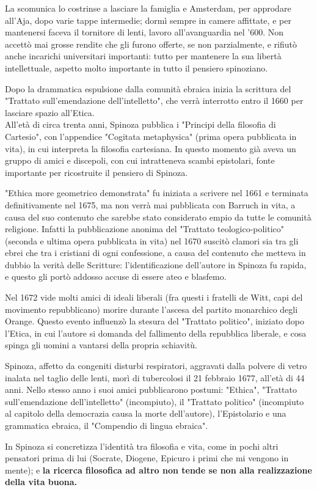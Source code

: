 La scomunica lo costrinse a lasciare la famiglia e Amsterdam, per approdare all'Aja, dopo varie tappe intermedie; dormì sempre in camere affittate, e per mantenersi faceva il tornitore di lenti, lavoro all'avanguardia nel '600. Non accettò mai grosse rendite che gli furono offerte, se non parzialmente, e rifiutò anche incarichi universitari importanti: tutto per mantenere la sua libertà intellettuale, aspetto molto importante in tutto il pensiero spinoziano.

Dopo la drammatica espulsione dalla comunità ebraica inizia la scrittura del "Trattato sull'emendazione dell'intelletto", che verrà interrotto entro il 1660 per lasciare spazio all'Etica.\\ All'età di circa trenta anni, Spinoza pubblica i "Principi della filosofia di Cartesio", con l'appendice "Cogitata metaphysica" (prima opera pubblicata in vita), in cui interpreta la filosofia cartesiana. In questo momento già aveva un gruppo di amici e discepoli, con cui intratteneva scambi epistolari, fonte importante per ricostruite il pensiero di Spinoza.

"Ethica more geometrico demonstrata" fu iniziata a scrivere nel 1661 e terminata definitivamente nel 1675, ma non verrà mai pubblicata con Barruch in vita, a causa del suo contenuto che sarebbe stato considerato empio da tutte le comunità religione. Infatti la pubblicazione anonima del "Trattato teologico-politico" (seconda e ultima opera pubblicata in vita) nel 1670 suscitò clamori sia tra gli ebrei che tra i cristiani di ogni confessione, a causa del contenuto che metteva in dubbio la verità delle Scritture: l'identificazione dell'autore in Spinoza fu rapida, e questo gli portò addosso accuse di essere ateo e blasfemo.

Nel 1672 vide molti amici di ideali liberali (fra questi i fratelli de Witt, capi del movimento repubblicano) morire durante l'ascesa del partito monarchico degli Orange. Questo evento influenzò la stesura del "Trattato politico", iniziato dopo l'Etica, in cui l'autore si domanda del fallimento della repubblica liberale, e cosa spinga gli uomini a vantarsi della propria schiavitù.

Spinoza, affetto da congeniti disturbi respiratori, aggravati dalla polvere di vetro inalata nel taglio delle lenti, morì di tubercolosi il 21 febbraio 1677, all'età di 44 anni. Nello stesso anno i suoi amici pubblicarono postumi: "Ethica", "Trattato sull'emendazione dell'intelletto" (incompiuto), il "Trattato politico" (incompiuto al capitolo della democrazia causa la morte dell'autore), l'Epistolario e una grammatica ebraica, il "Compendio di lingua ebraica".

In Spinoza si concretizza l’identità tra filosofia e vita, come in pochi altri pensatori prima di lui (Socrate, Diogene, Epicuro i primi che mi vengono in mente); e \textbf{la ricerca filosofica ad altro non tende se non alla realizzazione della vita buona.}
\newpage